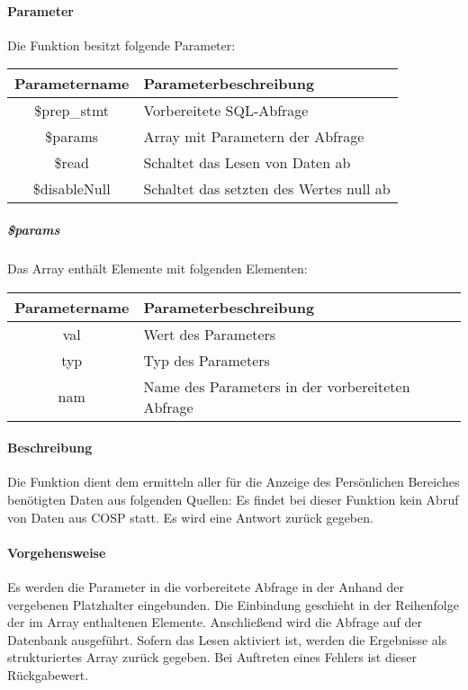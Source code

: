 \paragraph{Parameter} Die Funktion besitzt folgende Parameter:
\begin{table}[H]
	\begin{tabular}{|c|p{11cm}|}
		\hline
		\textbf{Parametername} & \textbf{Parameterbeschreibung} \\ \hline
		\$prep\_stmt  & Vorbereitete SQL-Abfrage \\ \hline
		\$params      & Array mit Parametern der Abfrage \\ \hline
		\$read        & Schaltet das Lesen von Daten ab \\ \hline
		\$disableNull & Schaltet das setzten des Wertes {\glqq null\grqq} ab \\ \hline
	\end{tabular}
\end{table}
\subparagraph{\$params}Das Array enthält Elemente mit folgenden Elementen:
\begin{table}[H]
	\begin{tabular}{|c|p{11cm}|}
		\hline
		\textbf{Parametername} & \textbf{Parameterbeschreibung} \\ \hline
		val & Wert des Parameters \\ \hline
		typ & Typ des Parameters \\ \hline
		nam & Name des Parameters in der vorbereiteten Abfrage \\ \hline
	\end{tabular}
\end{table}
\paragraph{Beschreibung} Die Funktion dient dem ermitteln aller für die Anzeige des Persönlichen Bereiches benötigten Daten aus folgenden Quellen:
Es findet bei dieser Funktion kein Abruf von Daten aus {\glqq COSP\grqq} statt. Es wird eine Antwort zurück gegeben.
\paragraph{Vorgehensweise} Es werden die Parameter in die vorbereitete Abfrage in der Anhand der vergebenen Platzhalter eingebunden. Die Einbindung geschieht in der Reihenfolge der im Array enthaltenen Elemente. Anschließend wird die Abfrage auf der Datenbank ausgeführt. Sofern das Lesen aktiviert ist, werden die Ergebnisse als strukturiertes Array zurück gegeben. Bei Auftreten eines Fehlers ist dieser Rückgabewert.
